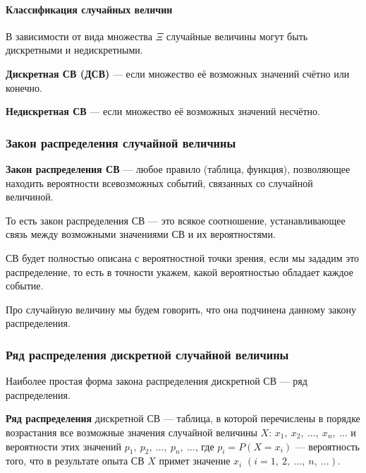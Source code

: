 \documentclass[a4paper]{article}
\newcommand{\key}[1]{{\color{Medium}\bfseries #1}}
\begin{document}
                \paragraph{Классификация случайных величин}

                    В зависимости от вида множества $\Xi$ случайные величины могут быть дискретными и недискретными.
                    
                    \key{Дискретная СВ (ДСВ)} --- если множество её возможных значений счётно или конечно.

                    \key{Недискретная СВ} --- если множество её возможных значений несчётно.

            \subsubsection{Закон распределения случайной величины}

                \key{Закон распределения СВ} --- любое правило (таблица, функция), позволяющее находить вероятности всевозможных событий, связанных со случайной величиной.
                
                То есть закон распределения СВ --- это всякое соотношение, устанавливающее связь между возможными значениями СВ и их вероятностями.
                
                СВ будет полностью описана с вероятностной точки зрения, если мы зададим это распределение, то есть в точности укажем, какой вероятностью обладает каждое событие.
                
                Про случайную величину мы будем говорить, что она подчинена данному закону распределения.

            \subsubsection{Ряд распределения дискретной случайной величины}

                Наиболее простая форма закона распределения дискретной СВ --- ряд распределения.
                
                \key{Ряд распределения} дискретной СВ --- таблица, в которой перечислены в порядке возрастания все возможные значения случайной величины $X$: $x_1 , \: x_2 , \: \ldots , \: x_n , \: \ldots$ и вероятности этих значений $p_1 , \: p_2 , \: \ldots , \: p_n , \: \ldots$, где $p_i = P(X = x_i)$ --- вероятность того, что в результате опыта СВ $X$ примет значение $x_i$ \:$(i = 1 , \: 2 , \: \ldots , \: n , \: \ldots)$.
\end{document}
